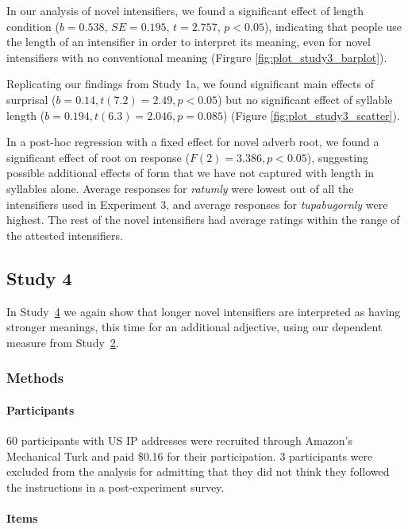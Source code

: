 \documentclass[10pt,letterpaper]{article}
\newcommand{\w}[1]{\emph{#1}}
\newcommand{\todo}[1]{{\color{red}#1}}
\begin{document}
In our analysis of novel intensifiers, we found a significant effect of length condition ($b=0.538$, $SE=0.195$, $t=2.757$, $p<0.05$), indicating that people use the length of an intensifier in order to interpret its meaning, even for novel intensifiers with no conventional meaning (Firgure \ref{fig:plot_study3_barplot}).

Replicating our findings from Study 1a, we found significant main effects of surprisal ($b=0.14, t(7.2)=2.49, p<0.05$) but no significant effect of syllable length ($b=0.194, t(6.3)=2.046, p=0.085$) (Figure \ref{fig:plot_study3_scatter}).

In a post-hoc regression with a fixed effect for novel adverb root, we found a significant effect of root on response ($F(2)=3.386, p<0.05$), suggesting possible additional effects of form that we have not captured with length in syllables alone.
Average responses for \w{ratumly} were lowest out of all the intensifiers used in Experiment 3, and average responses for \w{tupabugornly} were highest.
The rest of the novel intensifiers had average ratings within the range of the attested intensifiers.


\subsection{Study 4 \label{sec:study4}}

In Study~\hyperref[sec:study4]{4} we again show that longer novel intensifiers are interpreted as having stronger meanings, this time for an additional adjective, using our dependent measure from Study~\hyperref[sec:study2]{2}.

\subsubsection{Methods}

\paragraph{Participants}
60 participants with US IP addresses were recruited through Amazon's Mechanical Turk and paid \$0.16 for their participation. 3 participants were excluded from the analysis for admitting that they did not think they followed the instructions in a post-experiment survey.

\paragraph{Items}
\end{document}
